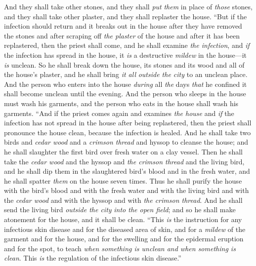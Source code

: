 \begin{biblechapter}
\verse And they shall take other stones, and they shall \textit{put} \textit{them} in place of \textit{those} stones, and they shall take other plaster, and they shall replaster the house.
\verse “But if the infection should return and it breaks out in the house after they have removed the stones and after scraping off \textit{the plaster} of the house and after it has been replastered,
\verse then the priest shall come, and he shall examine \textit{the infection}, and \textit{if} the infection has spread in the house, it \textit{is} a destructive \textit{mildew} in the house—it \textit{is} unclean.
\verse So he shall break down the house, its stones and its wood and all of the house’s plaster, and he shall bring \textit{it all} \textit{outside the city} to an unclean place.
\verse And the person who enters into the house \textit{during} all \textit{the} days \textit{that} he confined it shall become unclean until the evening.
\verse And the person who sleeps in the house must wash his garments, and the person who eats in the house shall wash his garments.
\verse “And if the priest comes again and examines \textit{the house} and \textit{if} the infection has not spread in the house after being replastered, then the priest shall pronounce the house clean, because the infection is healed.
\verse And he shall take two birds and \textit{cedar wood} and a \textit{crimson thread} and hyssop to cleanse the house;
\verse and he shall slaughter the first bird over fresh water on a clay vessel.
\verse Then he shall take the \textit{cedar wood} and the hyssop and \textit{the crimson thread} and the living bird, and he shall dip them in the slaughtered bird’s blood and in the fresh water, and he shall spatter \textit{them} on the house seven times.
\verse Thus he shall purify the house with the bird’s blood and with the fresh water and with the living bird and with the \textit{cedar wood} and with the hyssop and with \textit{the crimson thread}.
\verse And he shall send the living bird \textit{outside the city} \textit{into the open field}; and so he shall make atonement for the house, and it shall be clean.
\verse “This \textit{is} the instruction for any infectious skin disease and for the diseased area of skin,
\verse and for a \textit{mildew} of the garment and for the house,
\verse and for the swelling and for the epidermal eruption and for the spot,
\verse to teach \textit{when something is unclean and when something is clean}. This \textit{is} the regulation of the infectious skin disease.”
\end{biblechapter}

